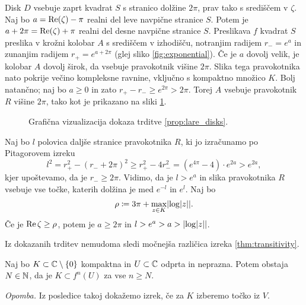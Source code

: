\begin{dokaz}
    Disk \(D\) vsebuje zaprt kvadrat \(S\) s stranico dolžine \(2 \pi\), prav tako s središčem v \(\zeta\). Naj bo \(a = \operatorname{Re} (\zeta) - \pi\) realni del leve navpične stranice \(S\). Potem je \(a + 2 \pi = \operatorname{Re} (\zeta) + \pi\) realni del desne navpične stranice \(S\). Preslikava \(f\) kvadrat \(S\) preslika v krožni kolobar \(A\) s središčem v izhodišču, notranjim radijem \(r_{-} = e^a\) in zunanjim radijem \(r_{+} = e^{a + 2 \pi}\) (glej sliko \ref{fig:exponential}). Če je \(a\) dovolj velik, je kolobar \(A\) dovolj širok, da vsebuje pravokotnik višine \(2 \pi\). Slika tega pravokotnika nato pokrije večino kompleksne ravnine, vključno s kompaktno množico \(K\). Bolj natančno; naj bo \(a \geq 0\) in zato \(r_+ - r_- \geq e^{2 \pi} > 2 \pi\). Torej \(A\) vsebuje pravokotnik \(R\) višine \(2 \pi\), tako kot je prikazano na sliki \ref{fig:transitivity}.
    \begin{figure}%
        \centering
        
        \caption{Grafična vizualizacija dokaza trditve \ref{prop:lare_disks}.}
        \label{fig:transitivity}
    \end{figure}
    Naj bo \(l\) polovica daljše stranice pravokotnika \(R\), ki jo izračunamo po Pitagorovem izreku
    \[l^2 = r_+^2 - (r_- + 2 \pi)^2 \geq r_+^2 - 4 r_-^2 = (e^{4 \pi} - 4) \cdot e^{2 a} > e^{2 a},\]
    kjer upoštevamo, da je \(r_- \geq 2 \pi\). Vidimo, da je \(l > e^a\) in slika pravokotnika \(R\) vsebuje vse točke, katerih dolžina je med \(e^{- l}\) in \(e^l\). Naj bo
    \[\rho \coloneq 3 \pi + \max_{z \in K} \abs{ \log \abs{z} }.\]
    Če je \(\operatorname{Re} \zeta \geq \rho\), potem je \(a \geq 2 \pi\) in \(l > e^a > a > \abs{\log \abs{z}}\).
\end{dokaz}

\noindent Iz dokazanih trditev nemudoma sledi močnejša različica izreka \ref{thm:transitivity}.

\begin{posledica}
    Naj bo \(K \subset \mathbb C \setminus \left\{ 0 \right\}\) kompaktna in \(U \subset \mathbb C\) odprta in neprazna. Potem obstaja \(N \in \mathbb N\), da je \(K \subset f^n (U)\) za vse \(n \geq N\).
\end{posledica}

\noindent \textit{Opomba.} Iz posledice takoj dokažemo izrek, če za \(K\) izberemo točko iz \(V\).

